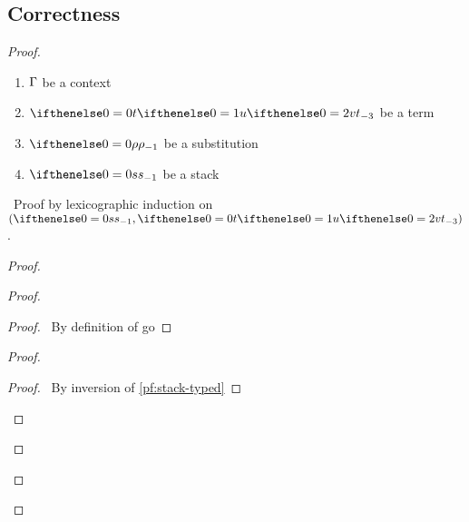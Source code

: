 \documentclass[a4paper]{article}
\begin{document}
\subsection{Correctness}
\begin{proof}
  \pflet
  {\begin{enumerate}
    \item $\Gamma$ be a context
    \item $\aTerm$ be a term
    \item $\env$ be a substitution
    \item $\aStack$ be a stack
  \end{enumerate}}
  \pfsketch\ Proof by lexicographic induction on $(\aStack, \aTerm)$.
  \begin{proof}
    \begin{proof}
      \begin{proof}
        \pf\ By definition of \textsf{go}
      \end{proof}
      \begin{proof}
        \begin{proof}
          \pf\ By inversion of \ref{pf:stack-typed}

\end{proof}
\end{proof}
\end{proof}
\end{proof}
\end{proof}
\end{document}
